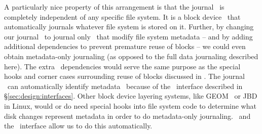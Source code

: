 A particularly nice property of this arrangement is that the journal \module\ is
completely independent of any specific file system. It is a block device
\module\ that automatically journals whatever file system is stored on it.
Further, by changing our journal \module\ to journal only \chdescs\ that modify
file system metadata -- and by adding additional dependencies to prevent
premature reuse of blocks -- we could even obtain metadata-only journaling (as
opposed to the full data journaling described here). The extra \chdesc\
dependencies would serve the same purpose as the special hooks and corner cases
surrounding reuse of blocks discussed in \cite{tweedie00ext3}. The journal
\module\ can automatically identify metadata \chdescs\ because of the \LFS\
interface described in \S\ref{sec:design:interfaces}. Other block device
layering systems, like GEOM~\cite{geom} or JBD in Linux, would or do need
special hooks into file system code to determine what disk changes represent
metadata in order to do metadata-only journaling. \Chdescs\ and the \LFS\
interface allow us to do this automatically.
